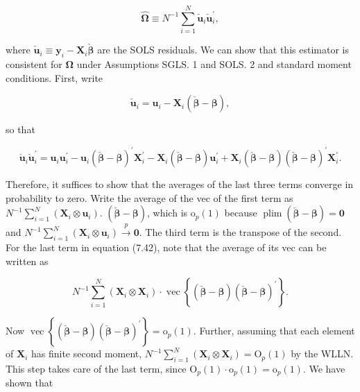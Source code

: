 \documentclass[10pt]{article}
\begin{document}
\begin{equation*}
\hat{\boldsymbol{\Omega}} \equiv N^{-1} \sum_{i=1}^{N} \check{\mathbf{u}}_{i} \check{\mathbf{u}}_{i}^{\prime}, \tag{7.40}
\end{equation*}


where $\check{\mathbf{u}}_{i} \equiv \mathbf{y}_{i}-\mathbf{X}_{i} \check{\boldsymbol{\beta}}$ are the SOLS residuals. We can show that this estimator is consistent for $\boldsymbol{\Omega}$ under Assumptions SGLS. 1 and SOLS. 2 and standard moment conditions. First, write


\begin{equation*}
\check{\mathbf{u}}_{i}=\mathbf{u}_{i}-\mathbf{X}_{i}(\check{\boldsymbol{\beta}}-\boldsymbol{\beta}), \tag{7.41}
\end{equation*}


so that


\begin{equation*}
\check{\mathbf{u}}_{i} \check{\mathbf{u}}_{i}^{\prime}=\mathbf{u}_{i} \mathbf{u}_{i}^{\prime}-\mathbf{u}_{i}(\check{\boldsymbol{\beta}}-\boldsymbol{\beta})^{\prime} \mathbf{X}_{i}^{\prime}-\mathbf{X}_{i}(\check{\boldsymbol{\beta}}-\boldsymbol{\beta}) \mathbf{u}_{i}^{\prime}+\mathbf{X}_{i}(\check{\boldsymbol{\beta}}-\boldsymbol{\beta})(\check{\boldsymbol{\beta}}-\boldsymbol{\beta})^{\prime} \mathbf{X}_{i}^{\prime} . \tag{7.42}
\end{equation*}


Therefore, it suffices to show that the averages of the last three terms converge in probability to zero. Write the average of the vec of the first term as $N^{-1} \sum_{i=1}^{N}\left(\mathbf{X}_{i} \otimes \mathbf{u}_{i}\right)$. $(\check{\boldsymbol{\beta}}-\boldsymbol{\beta})$, which is $\mathrm{o}_{p}(1)$ because $\operatorname{plim}(\check{\boldsymbol{\beta}}-\boldsymbol{\beta})=\mathbf{0}$ and $N^{-1} \sum_{i=1}^{N}\left(\mathbf{X}_{i} \otimes \mathbf{u}_{i}\right) \xrightarrow{p} \mathbf{0}$. The third term is the transpose of the second. For the last term in equation (7.42), note that the average of its vec can be written as


\begin{equation*}
N^{-1} \sum_{i=1}^{N}\left(\mathbf{X}_{i} \otimes \mathbf{X}_{i}\right) \cdot \operatorname{vec}\left\{(\check{\boldsymbol{\beta}}-\boldsymbol{\beta})(\check{\boldsymbol{\beta}}-\boldsymbol{\beta})^{\prime}\right\} . \tag{7.43}
\end{equation*}


Now $\operatorname{vec}\left\{(\check{\boldsymbol{\beta}}-\boldsymbol{\beta})(\check{\boldsymbol{\beta}}-\boldsymbol{\beta})^{\prime}\right\}=\mathrm{o}_{p}(1)$. Further, assuming that each element of $\mathbf{X}_{i}$ has finite second moment, $N^{-1} \sum_{i=1}^{N}\left(\mathbf{X}_{i} \otimes \mathbf{X}_{i}\right)=\mathrm{O}_{p}(1)$ by the WLLN. This step takes care of the last term, since $\mathrm{O}_{p}(1) \cdot \mathrm{o}_{p}(1)=\mathrm{o}_{p}(1)$. We have shown that
\end{document}
